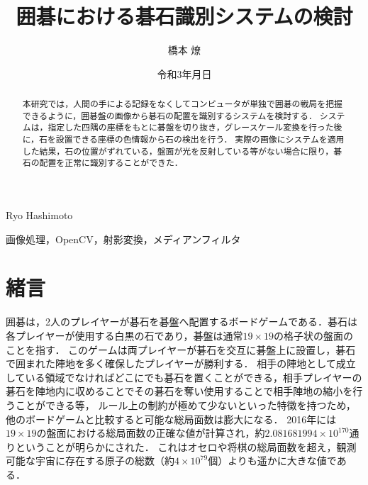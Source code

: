 \documentclass[openright]{nitocs}
\numberwithin{equation}{section}
\begin{document}
    \title{囲碁における碁石識別システムの検討}  %
    \author{橋本 燎}{Ryo Hashimoto} %
    \date{令和3年\number\month 月\number\day 日} %

    \begin{abstract} %
        本研究では，人間の手による記録をなくしてコンピュータが単独で囲碁の戦局を把握できるように，囲碁盤の画像から碁石の配置を識別するシステムを検討する．
        システムは，指定した四隅の座標をもとに碁盤を切り抜き，グレースケール変換を行った後に，石を設置できる座標の色情報から石の検出を行う．
        実際の画像にシステムを適用した結果，石の位置がずれている，盤面が光を反射している等がない場合に限り，碁石の配置を正常に識別することができた．
    \end{abstract}

    \begin{keyword} %
        画像処理，OpenCV，射影変換，メディアンフィルタ
    \end{keyword}


    \maketitle

    \section{緒言}  
    \label{sec:format}
        囲碁は，2人のプレイヤーが碁石を碁盤へ配置するボードゲームである．碁石は各プレイヤーが使用する白黒の石であり，碁盤は通常$19\times19$の格子状の盤面のことを指す．
        このゲームは両プレイヤーが碁石を交互に碁盤上に設置し，碁石で囲まれた陣地を多く確保したプレイヤーが勝利する．
        相手の陣地として成立している領域でなければどこにでも碁石を置くことができる，相手プレイヤーの碁石を陣地内に収めることでその碁石を奪い使用することで相手陣地の縮小を行うことができる等，
        ルール上の制約が極めて少ないといった特徴を持つため，他のボードゲームと比較すると可能な総局面数は膨大になる．
        2016年には$19\times19$の盤面における総局面数の正確な値が計算され，約$2.081681994 \times 10^{170}$通りということが明らかにされた\cite{numbers}．
        これはオセロや将棋の総局面数を超え，観測可能な宇宙に存在する原子の総数（約$4\times10^{79}$個）よりも遥かに大きな値である．
\end{document}
